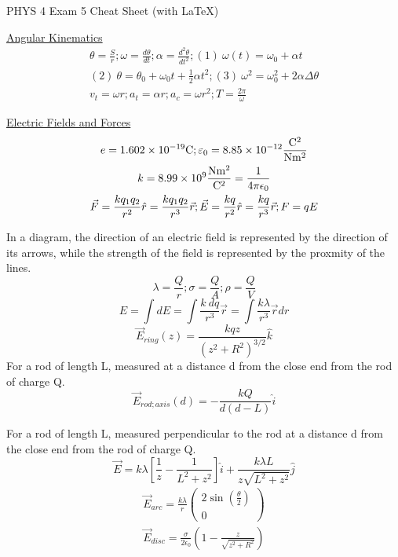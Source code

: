 \documentclass[8pt]{minimal}
\begin{document}
\setlength{\parindent}{0pt}
\setlength{\columnsep}{1cm}
\twocolumn
PHYS 4 Exam 5 Cheat Sheet (with \LaTeX)

\underline{Angular Kinematics}
\begin{gather*}
    \theta = \frac{S}{r}; \omega = \frac{d\theta}{dt}; \alpha = \frac{d^2\theta}{dt^2}; (1)\ \omega(t) = \omega_0 + \alpha t\\
    (2)\ \theta = \theta_0 + \omega_0t + \frac{1}{2}\alpha t^2; (3)\ \omega^2 = \omega_0^2 + 2\alpha\Delta\theta\\
    v_t = \omega r; a_t = \alpha r; a_c = \omega r^2; T = \frac{2 \pi}{\omega}
\end{gather*}

\underline{Electric Fields and Forces}
\begin{gather*}
    e = 1.602 \times 10^{-19} \unit{\coulomb}; \varepsilon_0 = 8.85 \times 10^{-12} \unit{\frac{\coulomb^2}{\newton\meter^2}}\\
    k = 8.99 \times 10^9 \unit{\frac{\newton\meter^2}{\coulomb^2}}= \frac{1}{4\pi\epsilon_0}\\
    \vec{F} = \frac{kq_1q_2}{r^2}\hat{r} = \frac{kq_1q_2}{r^3}\vec{r};
    \vec{E} = \frac{kq}{r^2}\hat{r} = \frac{kq}{r^3}\vec{r}; F = qE
\end{gather*}

In a diagram, the direction of an electric field is represented by the direction of its arrows, while the strength of the field is represented by the proxmity of the lines.
\[\lambda = \frac{Q}{r} ; \sigma = \frac{Q}{A} ; \rho = \frac{Q}{V}\]
\[E = \int dE = \int \frac{k\ dq}{r^3}\vec{r} = \int \frac{k \lambda}{r^3}\vec{r}dr\]
\[ \vec{E}_{ring}(z) = \frac{kqz}{(z^2 + R^2)^{3/2}}\hat{k} \]
For a rod of length L, measured at a distance d from the close end from the rod of charge Q.
\[ \vec{E}_{rod;axis}(d) = -\frac{kQ}{d(d-L)}\hat{i} \]

For a rod of length L, measured perpendicular to the rod at a distance d from the close end from the rod of charge Q.
\[\vec{E} = k\lambda \left[ \frac{1}{z} - \frac{1}{L^2 + z^2} \right]\hat{i} + \frac{k\lambda L}{z\sqrt{L^2 + z^2}} \hat{j}\]
\begin{gather*}
    \vec{E}_{arc} = \frac{k\lambda}{r} \begin{pmatrix}2\sin(\frac{\theta}{2})\\0\end{pmatrix}\\
    \vec{E}_{disc} = \frac{\sigma}{2\epsilon_0} \left(1 - \frac{z}{\sqrt{z^2 + R^2}}\right)
\end{gather*}
\end{document}
